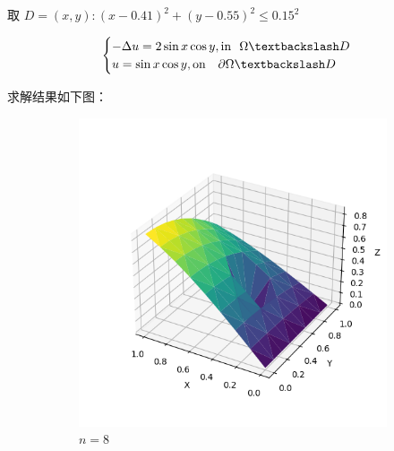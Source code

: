 \documentclass[lang=cn,a4paper,newtx,bibend=bibtex]{elegantpaper}
\begin{document}
取 $D = {(x, y) : (x - 0.41)^2 + (y - 0.55)^2 \le 0.15^2}$


\[
\begin{cases}
  - \Delta u = 2\sin x \cos y, \text{in~~} \Omega \fxg D \\
  u = \sin x \cos y, \text{on ~~} \partial \Omega \fxg D
\end{cases}
\]

求解结果如下图：

\begin{figure}[H]
  \centering
  \begin{subfigure}[b]{0.18\textwidth}
      \includegraphics[width=\textwidth]{../../res_bac/res-[data|2-Dirichlet-irregular-a8].png}
      \caption{$n =  8$}
  \end{subfigure}
  \hfill
  \begin{subfigure}[b]{0.18\textwidth}

\end{subfigure}
\end{figure}
\end{document}
